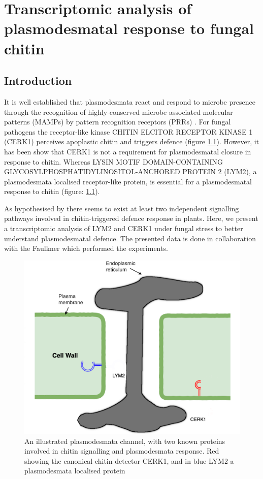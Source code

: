 \documentclass[../main.tex]{subfiles}
\begin{document}
\chapter{Transcriptomic analysis of plasmodesmatal response to fungal chitin}
\label{cha:transcripts}

\section{Introduction}
It is well established that plasmodesmata react and respond to microbe presence
through the recognition of highly-conserved microbe associated molecular
patterns (MAMPs) by pattern recognition receptors (PRRs)
\cite{zipfelPlantPatternrecognitionReceptors2014a,
  chevalPlasmodesmalRegulationPlant2018}. For fungal pathogens the receptor-like
kinase CHITIN ELCITOR RECEPTOR KINASE 1 (CERK1) perceives apoplastic chitin and
triggers defence \cite{miyaCERK1LysMReceptor2007} (figure \ref{fig:receptors}).
However, it has been show that CERK1 is not a requirement for plasmodesmatal
closure in response to chitin. Whereas LYSIN MOTIF
DOMAIN-CONTAINING GLYCOSYLPHOSPHATIDYLINOSITOL-ANCHORED PROTEIN 2 (LYM2), a
plasmodesmata localised receptor-like protein, is
essential for a plasmodesmatal response to chitin \cite{Faulkner2013}
(figure: \ref{fig:receptors}).


As hypothesised by \citet{Faulkner2013} there seems to exist at least two
independent signalling pathways involved in chitin-triggered defence response in
plants. Here, we present a transcriptomic analysis of LYM2 and CERK1 under
fungal stress to better understand plasmodesmatal defence. The presented data is
done in collaboration with the Faulkner which performed the experiments.


\begin{figure}[ht]
  \centering
  \includegraphics[width=0.5\columnwidth]{figures/original desmotubule.png}
  \caption[Plasmodesmata, \textit{lym2-1} and\textit{cerk2-1}diagram]{\label{fig:receptors}
    An illustrated plasmodesmata channel, with two
    known proteins involved in chitin signalling and plasmodesmata response. Red
    showing the canonical chitin detector CERK1, and in blue LYM2 a
    plasmodesmata localised protein}
\end{figure}
\end{document}
